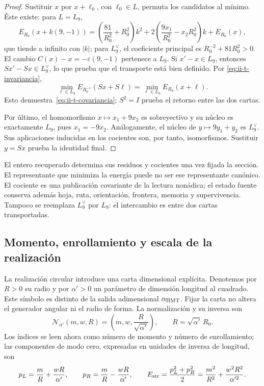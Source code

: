 \begin{proof}
Sustituir \(x\) por \(x+\ell_0\), con \(\ell_0\in L\),
permuta los candidatos al mínimo. Éste existe: para \(L=L_9\),
\[
 E_{R_0}(x+k(9,-1))
 =\left(\frac{81}{R_0^2}+R_0^2\right)k^2
  +2\left(\frac{9x_1}{R_0^2}-x_2R_0^2\right)k+E_{R_0}(x),
\]
que tiende a infinito con \(|k|\); para \(L_9^\vee\), el
coeficiente principal es \(R_0^{-2}+81R_0^2>0\). El cambio
\(C(x)-x=-\varepsilon(9,-1)\) pertenece a \(L_9\).
Si \(x'-x\in L_9\), entonces \(Sx'-Sx\in L_9^\vee\),
lo que prueba que el transporte está bien definido. Por
\eqref{eq:ii-t-invariancia},
\[
 \min_{\ell\in L_9}E_{R_0^{-1}}(Sx+S\ell)
 =\min_{\ell\in L_9}E_{R_0}(x+\ell).
\]
Esto demuestra~\eqref{eq:ii-t-covariancia}; \(S^2=I\) prueba
el retorno entre las dos cartas.

Por último, el homomorfismo \(x\mapsto x_1+9x_2\) es
sobreyectivo y su núcleo es exactamente \(L_9\), pues
\(x_1=-9x_2\). Análogamente, el núcleo de
\(y\mapsto9y_1+y_2\) es \(L_9^\vee\). Sus aplicaciones
inducidas en los cocientes son, por tanto, isomorfismos. Sustituir
\(y=Sx\) prueba la identidad final.
\end{proof}

El entero recuperado determina sus residuos y cocientes una vez fijada
la sección. El representante que minimiza la energía puede no ser ese
representante canónico. El cociente es una publicación covariante de la
lectura nonádica; el estado fuente conserva además hoja, ruta, orientación,
frontera, memoria y supervivencia. Tampoco se reemplaza \(L_9^\vee\)
por \(L_9\): el intercambio es entre dos cartas transportadas.

\subsection{Momento, enrollamiento y escala de la realización}

La realización circular introduce una carta dimensional explícita.
Denotemos por \(R>0\) su radio y por \(\alpha'>0\) un parámetro
de dimensión longitud al cuadrado. Este símbolo es distinto de la salida
adimensional \(\alpha_{\rm HMT}\). Fijar la carta no altera el
generador angular ni el radio de forma. La normalización y su inversa son
\[
 \mathcal N_{\alpha'}(m,w,R)
 =\left(m,w,\frac{R}{\sqrt{\alpha'}}\right),\qquad
 R=\sqrt{\alpha'}\,R_0.
\]
Los índices se leen ahora como número de momento y número de
enrollamiento; las componentes de modo cero, expresadas en unidades de
inversa de longitud, son
\begin{equation}
 p_L=\frac mR+\frac{wR}{\alpha'},\qquad
 p_R=\frac mR-\frac{wR}{\alpha'},\qquad
 E_{\rm str}=\frac{p_L^2+p_R^2}{2}
 =\frac{m^2}{R^2}+\frac{w^2R^2}{\alpha'^2}.
 \label{eq:ii-t-quirales}
\end{equation}

